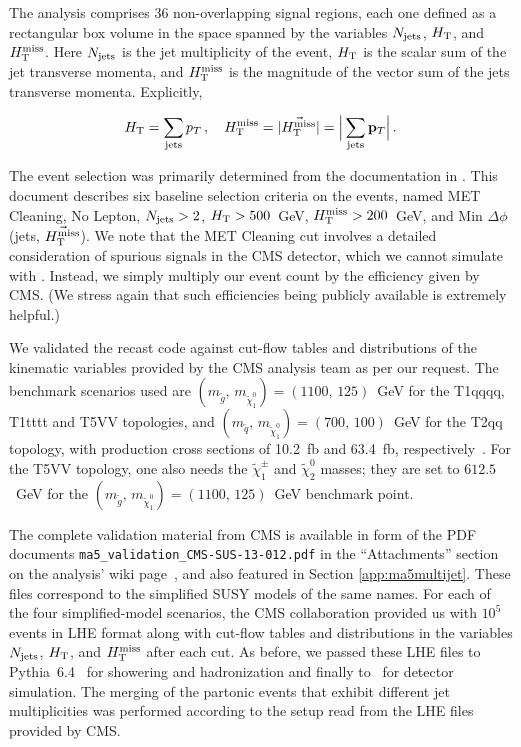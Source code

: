 The analysis comprises 36 non-overlapping signal regions, each one defined as
a rectangular box volume in the space spanned by the variables $N_{\rm jets}$, $H_{\rm T}$, and $H_{\text{T}}^{\rm miss}$. Here $N_{\rm jets}$ is the jet multiplicity of the event, $H_{\rm T}$ is the scalar sum of the jet transverse momenta, and $H_{\text{T}}^{\rm miss}$ is the magnitude of the vector sum of the jets transverse momenta. Explicitly, 

\begin{equation}
  H_{\rm T} = \sum_{\rm jets}{p_T}\,,\quad  H_{\text{T}}^{\rm miss} =  |\vec{H_{\text{T}}^{\rm miss}}| = \Big| \sum_{\rm jets}{{\bf p}_T} \Big|\,.
\label{eq:HTdefs}
\end{equation}

The event selection was primarily determined from the documentation in \cite{Chatrchyan:2014lfa}. This document describes six baseline selection criteria on the events, named MET Cleaning, No Lepton, $N_{\rm jets}>2$, 
$H_{\rm T}>500$~GeV, $H_{\text{T}}^{\rm miss}>200$~GeV, and Min $\Delta\phi$({\rm jets}, $\vec{H_{\text{T}}^{\rm miss}}$). We note that the MET Cleaning cut involves a detailed consideration of spurious signals in the CMS detector, which we cannot simulate with \delphes. Instead, we simply multiply our event count by the efficiency given by CMS. (We stress again that such efficiencies being publicly available is extremely helpful.)

We validated the recast code against cut-flow tables and distributions of the kinematic variables provided by the CMS analysis team as per our request. The benchmark scenarios used are $(m_{\tilde g},\,m_{\tilde\chi^0_1})=(1100,\,125)$~GeV for the   T1qqqq, T1tttt and T5VV topologies, and $(m_{\tilde q},\,m_{\tilde\chi^0_1})=(700,\,100)$~GeV for the T2qq topology, 
with production cross sections of 10.2~fb and 63.4~fb, respectively~\cite{Kramer:2012bx}.  
For the T5VV topology, one also needs the $\tilde\chi^\pm_1$ and $\tilde\chi^0_2$ masses; 
they are set to $612.5$~GeV for the $(m_{\tilde g},\,m_{\tilde\chi^0_1})=(1100,\,125)$~GeV benchmark point. 

The complete validation material from CMS is available in form of the PDF documents  
\texttt{ma5\_validation\_CMS-SUS-13-012.pdf} in the ``Attachments'' section 
on the analysis' wiki page~\cite{ma5wiki}, and also featured in Section \ref{app:ma5multijet}. 
These files correspond to the simplified SUSY models of the same names.  
For each of the four simplified-model scenarios, the CMS collaboration provided us with $10^5$ events in LHE format along with cut-flow tables and distributions in the variables $N_{\rm jets}$, $H_{\rm T}$, and $H_{\text{T}}^{\rm miss}$ after each cut. As before, we passed these LHE files to {\sc Pythia}~6.4~\cite{Sjostrand:2006za} for showering and hadronization and finally to \delphes\ for detector simulation. 
The merging of the partonic events that exhibit different jet multiplicities was performed according to the setup read from the LHE files provided by CMS. 

